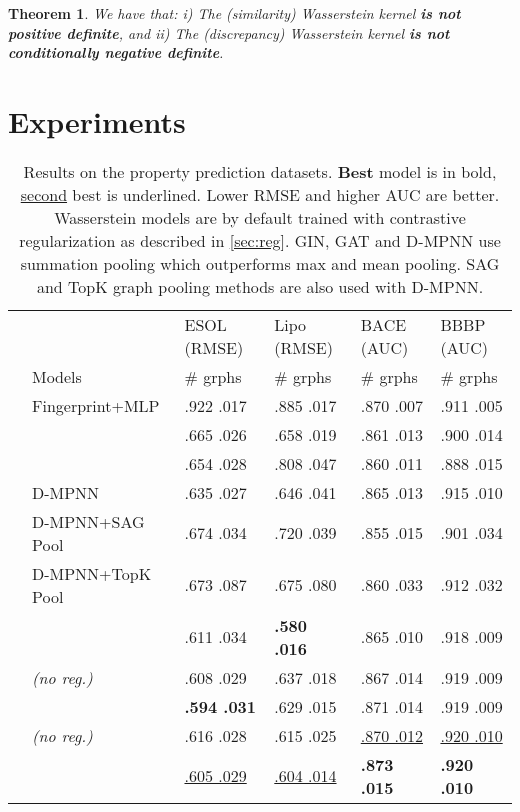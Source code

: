 \documentclass[letterpaper]{article} \usepackage{aaai22}  \usepackage{times}  \usepackage{helvet}  \usepackage{courier}  \usepackage[hyphens]{url}  \usepackage{graphicx} \urlstyle{rm} \def\UrlFont{\rm}  \usepackage{natbib}  \usepackage{caption} \DeclareCaptionStyle{ruled}{labelfont=normalfont,labelsep=colon,strut=off} \frenchspacing  \setlength{\pdfpagewidth}{8.5in}  \setlength{\pdfpageheight}{11in}  \usepackage{algorithm}
\newtheorem{theorem}{Theorem}
\begin{document}
\begin{theorem}
\label{thm:pd}
We have that: i) The (similarity) Wasserstein kernel  \textbf{is not positive definite}, and ii) The (discrepancy) Wasserstein kernel  \textbf{is not conditionally negative definite}.
\end{theorem}

\section{Experiments} \label{sec:exp}

\begin{table*}
\begin{center}
  \begin{tabular}{c|p{3.2cm}|p{2.18cm}|p{2.08cm}|p{2.08cm}|p{2.08cm} }
 & & ESOL (RMSE)  & Lipo (RMSE)  & BACE (AUC)  & BBBP (AUC) \\
& Models \ & \# grphs  & \# grphs & \# grphs & \# grphs \\  
 \hline \hline
\parbox[t]{2mm}{} & Fingerprint+MLP \qquad & .922  .017& .885  .017 & .870  .007 & .911  .005 \\ 
&  \qquad & .665  .026 & .658  .019 & .861  .013 & .900  .014 \\ 
&  \qquad & .654  .028 & .808  .047 & .860  .011 & .888  .015 \\ 
& D-MPNN \qquad & .635  .027& .646  .041 & .865  .013 & .915  .010 \\ 
& D-MPNN+SAG Pool \qquad & .674  .034 & .720  .039 & .855  .015 & .901  .034 \\
& D-MPNN+TopK Pool \qquad & .673  .087 & .675  .080 & .860  .033 & .912  .032 \\
 \hline \hline
\parbox[t]{2mm}{} & \qquad\ \ \ \ \ \ \  & .611  .034 & \textbf{.580  .016}& .865  .010 & .918  .009 \\ 
&  \textit{(no reg.)} & .608  .029 & .637  .018 & .867  .014 & .919  .009 \\
& \quad\ \ \ \ \ \,   & \textbf{.594  .031} & .629  .015 & .871  .014 & .919  .009 \\
 
&  \textit{(no reg.)}\ \ & .616  .028 & .615  .025 & \underline{.870  .012} & \underline{.920  .010} \\
& \qquad\quad \ \ \ \ \ & \underline{.605  .029} & \underline{.604  .014} & \textbf{.873  .015} & \textbf{.920  .010} \\
  \end{tabular}
 
\caption{Results on the property prediction datasets. \textbf{Best} model is in bold, \underline{second} best is underlined. Lower RMSE and higher AUC are better. Wasserstein models are by default trained with contrastive regularization as described in \cref{sec:reg}. GIN, GAT and D-MPNN use summation pooling which outperforms max and mean pooling. SAG and TopK graph pooling methods are also used with D-MPNN. }
\label{tab:1}
\end{center}
\end{table*}
\end{document}
